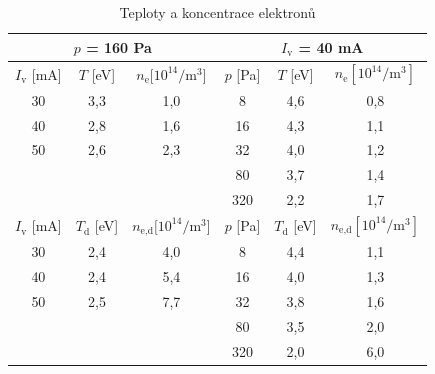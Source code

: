 \documentclass[a4paper,12pt]{article}
\begin{document}
\begin{center}
	\begin{table}[h!]
		\centering
		\caption{Teploty a koncentrace elektronů}
		\label{tab2}
		\begin{tabular}{|c|c|c|c|c|c|} \hline
			 \multicolumn{3}{|c|}{$p$ = 160 \si{\pascal}}& \multicolumn{3}{c|}{$I_\text{v}$ = 40 \si{\milli\ampere} }  \\ \hline
			$I_\text{v}$ [\si{\milli\ampere}] &  $T$ [eV] & $n_\text{e} [10^{14}\si{\per\meter\cubed}$] & $p$ [\si{\pascal}] &  $T$ [eV] & $n_\text{e} [10^{14}\si{\per\meter\cubed}]$ \\ \hline
			30 & 3,3 & 1,0 & 8 & 4,6 & 0,8\\ \hline
			40 & 2,8 & 1,6 & 16 & 4,3 & 1,1 \\ \hline
			50 & 2,6 & 2,3 & 32 & 4,0 & 1,2\\ \hline
			&  &  & 80 & 3,7 & 1,4 \\ \hline
			& &  & 320 & 2,2 & 1,7 \\ \hline
			$I_\text{v}$ [\si{\milli\ampere}] &  $T_\text{d}$ [eV] & 
			$n_\text{e,d} [10^{14}\si{\per\meter\cubed}$] & $p$ [\si{\pascal}] 
			&  $T_\text{d}$ [eV] & $n_\text{e,d} 
			[10^{14}\si{\per\meter\cubed}]$ \\ \hline
			30 & 2,4 & 4,0 & 8 & 4,4 & 1,1\\ \hline
			40 & 2,4 & 5,4 & 16 & 4,0 & 1,3 \\ \hline
			50 & 2,5 & 7,7 & 32 & 3,8 & 1,6\\ \hline
			&  &  & 80 & 3,5 & 2,0 \\ \hline
			& &  & 320 & 2,0 & 6,0 \\ \hline
			
		\end{tabular}
	\end{table}
\end{center}
\newpage
\end{document}
